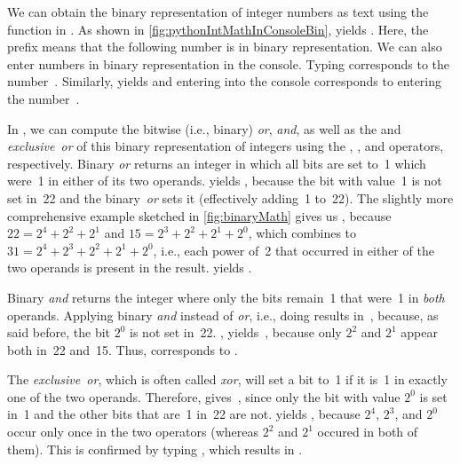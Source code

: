 We can obtain the binary representation of integer numbers as text using the  function in \python.
As shown in \cref{fig:pythonIntMathInConsoleBin},  yields .
Here, the  prefix means that the following number is in binary representation.
We can also enter numbers in binary representation in the console.
Typing  corresponds to the number~.
Similarly,  yields  and entering  into the console corresponds to entering the number~.

In \python, we can compute the bitwise (i.e., binary) \emph{or}, \emph{and}, as well as the and \emph{exclusive~or} of this binary representation of integers using the \pythonil{|}, \pythonil{&}, and \pythonil{^} operators, respectively.
Binary \emph{or} returns an integer in which all bits are set to~1 which were~1 in either of its two operands.
 yields , because the bit with value~1 is not set in~22 and the binary~\emph{or} sets it (effectively adding~1 to~22).
The slightly more comprehensive example  sketched in \cref{fig:binaryMath} gives us , because $22=2^4+2^2+2^1$ and $15=2^3+2^2+2^1+2^0$, which \pythonil{|} combines to $31=2^4+2^3+2^2+2^1+2^0$, i.e., each power of~2 that occurred in either of the two operands is present in the result.
 yields .

Binary \emph{and} returns the integer where only the bits remain~1 that were~1 in \emph{both} operands.
Applying binary \emph{and} instead of \emph{or}, i.e., doing \pythonIdx{\&} results in~, because, as said before, the bit $2^0$ is not set in~22.
, yields~, because only $2^2$ and $2^1$ appear both in~22 and~15.
Thus,  corresponds to .

The \emph{exclusive~or}, which is often called \emph{xor}, will set a bit to~1 if it is~1 in exactly one of the two operands.
Therefore, \pythonIdx{\^{}} gives~, since only the bit with value $2^0$ is set in~1 and the other bits that are~1 in~22 are not.
 yields , because $2^4$, $2^3$, and $2^0$ occur only once in the two operators (whereas $2^2$ and $2^1$ occured in both of them).
This is confirmed by typing , which results in .

